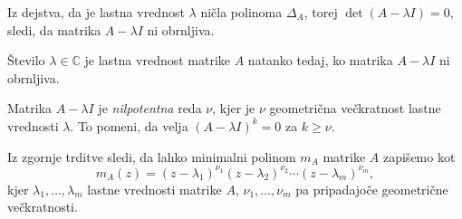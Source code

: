 \documentclass[mat1]{fmfdelo}
\newcommand{\C}{\mathbb C}
\begin{document}
Iz dejstva, da je lastna vrednost $\lambda$ ničla polinoma $\Delta_A$, torej $\det (A - \lambda I) = 0$, sledi, da matrika  $A - \lambda I$ ni obrnljiva.
\begin{posledica}\label{posledicaObrnljivostLV}
    Število $\lambda \in \C$ je lastna vrednost matrike $A$ natanko tedaj, ko matrika $A - \lambda I$ ni obrnljiva.
\end{posledica}
Matrika $A - \lambda I$ je \emph{nilpotentna} reda $\nu$, kjer je $\nu$ geometrična večkratnost lastne vrednosti $\lambda$. To pomeni, da velja $(A - \lambda I)^k = 0$ za $k \geq \nu$.

Iz zgornje trditve sledi, da lahko minimalni polinom $m_A$ matrike $A$ zapišemo kot
\begin{equation}
    m_A(z) = (z-\lambda_1)^{\nu_1}(z-\lambda_2)^{\nu_2}\cdots (z-\lambda_m)^{\nu_m},
\end{equation}
kjer $\lambda_1, \ldots, \lambda_m$ lastne vrednosti matrike $A$, $\nu_1, \ldots, \nu_m$ pa pripadajoče geometrične večkratnosti.
\end{document}
